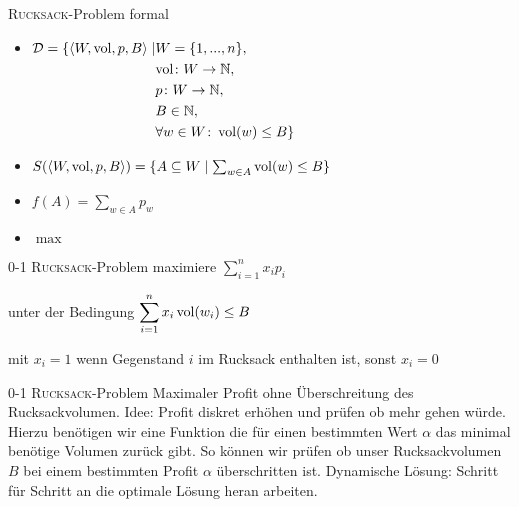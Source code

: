 \begin{frame}{\textsc{Rucksack}-Problem formal}
    \begin{itemize}
        \item $\begin{aligned}[t] 
            \mathcal{D}=\{\langle W,\operatorname{vol},p,B \rangle \mid & W=\{1,...,n\}, & \\
                                                                & \text{vol} \colon W \to \mathbb{N}, & \\
                                                                & p \colon W \to \mathbb{N}, & \\
                                                                & B \in \mathbb{N}, & \\
                                                                & \forall w \in W \colon \operatorname{vol}(w) \leq B \}
         \end{aligned}$
        
        \item $S( \langle W, \text{vol}, p, B \rangle )=\{ A \subseteq W \mid \sum_{w\in A}{ \operatorname{vol}(w)} \leq B \}$
        \item $f(A)=\sum_{w\in A}{p_w}$
        \item $\max$
    \end{itemize}
\end{frame}
\begin{frame}{0-1 \textsc{Rucksack}-Problem}
    maximiere $\displaystyle \sum_{i=1}^{n}{x_i p_i}$
       
    unter der Bedingung $\displaystyle \sum_{i=1}^{n}{x_i \operatorname{vol}(w_i) \leq B}$
       
    mit $x_i=1$ wenn Gegenstand $i$ im Rucksack enthalten ist, sonst $x_i=0$
\end{frame}
\begin{frame}{0-1 \textsc{Rucksack}-Problem}
    Maximaler Profit ohne Überschreitung des Rucksackvolumen.
    Idee: Profit diskret erhöhen und prüfen ob mehr gehen würde.
    Hierzu benötigen wir eine Funktion die für einen bestimmten Wert $\alpha$ das minimal benötige Volumen zurück gibt.
    So können wir prüfen ob unser Rucksackvolumen $B$ bei einem bestimmten Profit $\alpha$ überschritten ist.
    Dynamische Lösung: Schritt für Schritt an die optimale Lösung heran arbeiten.
\end{frame}
